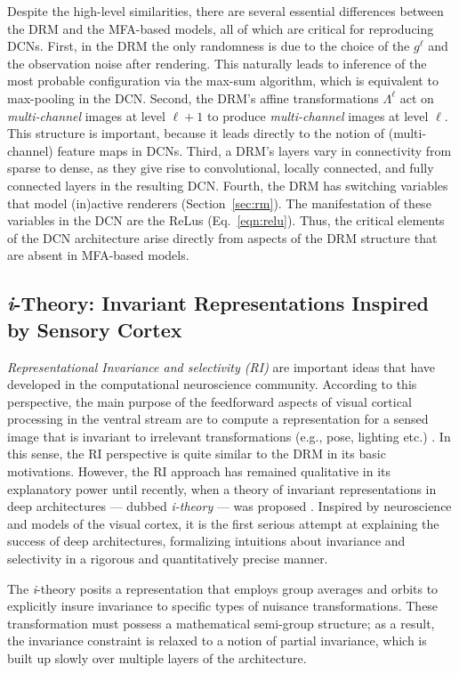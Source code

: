 \documentclass[12pt]{article}
\newcommand{\ith}[0]{{ \emph{i}-theory }}
\begin{document}
Despite the high-level similarities, there are several essential differences between the DRM and the MFA-based models, all of which are critical for reproducing DCNs. 
First, in the DRM the only randomness is due to the choice of the $g^{\ell}$ and the observation noise after rendering. 
This naturally leads to inference of the most probable configuration via the max-sum algorithm, which is equivalent to max-pooling in the DCN. Second, the DRM's affine transformations $\Lambda^{\ell}$ act on {\em multi-channel} images at level $\ell+1$ to produce {\em multi-channel} images at level $\ell$. This structure is important, because it leads directly to the notion of (multi-channel) feature maps in DCNs. Third, a DRM's layers vary in connectivity from sparse to dense, as they give rise to convolutional, locally connected, and fully connected layers in the resulting DCN. Fourth, the DRM has switching variables that model (in)active renderers (Section~\ref{sec:rm}). The manifestation of these variables in the DCN are the ReLus (Eq.~\ref{eqn:relu}). Thus, the critical elements of the DCN architecture arise directly from aspects of the DRM structure that are absent in MFA-based models.


\subsection{\emph{i}-Theory: Invariant Representations Inspired by Sensory Cortex }

\emph{Representational Invariance and selectivity (RI)} are important ideas that have developed in the computational neuroscience community.
According to this perspective, the main purpose of the feedforward aspects of visual cortical processing in the ventral stream are to compute a representation for a sensed image that is invariant to irrelevant transformations (e.g., pose, lighting etc.) \cite{Pinto:2008bo,DiCarlo:2012em}. In this sense, the RI perspective is quite similar to the DRM in its basic motivations. However, the RI approach has remained qualitative in its explanatory power until recently, when a theory of invariant representations in deep architectures --- dubbed \emph{i-theory} ---  was proposed \cite{Anselmi:2007ke,PoggioOnInvariance}. Inspired by neuroscience and models of the visual cortex, it is the first serious attempt at explaining the success of deep architectures, formalizing intuitions about invariance and selectivity in a rigorous and quantitatively precise manner. 

The \ith posits a representation that employs group averages and orbits to explicitly insure invariance to specific types of nuisance transformations. These transformation must possess a mathematical semi-group structure; as a result, the invariance constraint is relaxed to a notion of partial invariance, which is built up slowly over multiple layers of the architecture.
\end{document}
